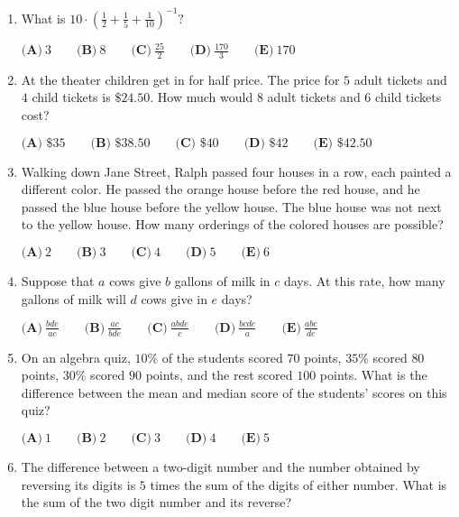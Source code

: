 \documentclass{article}
\begin{document}
\begin{enumerate}[label=\arabic*., itemsep=0.5em]
\item What is \(10 \cdot \left(\tfrac{1}{2} + \tfrac{1}{5} + \tfrac{1}{10}\right)^{-1}?\)

\( \textbf{(A)}\ 3\qquad\textbf{(B)}\ 8\qquad\textbf{(C)}\ \frac{25}{2}\qquad\textbf{(D)}\ \frac{170}{3}\qquad\textbf{(E)}\ 170\)\par \vspace{0.5em}\item At the theater children get in for half price.  The price for \(5\) adult tickets and \(4\) child tickets is \(\$24.50\).  How much would \(8\) adult tickets and \(6\) child tickets cost?

\(\textbf{(A) }\$35\qquad
\textbf{(B) }\$38.50\qquad
\textbf{(C) }\$40\qquad
\textbf{(D) }\$42\qquad
\textbf{(E) }\$42.50\)\par \vspace{0.5em}\item Walking down Jane Street, Ralph passed four houses in a row, each painted a different color. He passed the orange house before the red house, and he passed the blue house before the yellow house. The blue house was not next to the yellow house. How many orderings of the colored houses are possible?

\( \textbf{(A)}\ 2\qquad\textbf{(B)}\ 3\qquad\textbf{(C)}\ 4\qquad\textbf{(D)}\ 5\qquad\textbf{(E)}\ 6\)\par \vspace{0.5em}\item Suppose that \(a\) cows give \(b\) gallons of milk in \(c\) days. At this rate, how many gallons of milk will \(d\) cows give in \(e\) days?

\( \textbf{(A)}\ \frac{bde}{ac}\qquad\textbf{(B)}\ \frac{ac}{bde}\qquad\textbf{(C)}\ \frac{abde}{c}\qquad\textbf{(D)}\ \frac{bcde}{a}\qquad\textbf{(E)}\ \frac{abc}{de}\)\par \vspace{0.5em}\item On an algebra quiz, \(10\%\) of the students scored \(70\) points, \(35\%\) scored \(80\) points, \(30\%\) scored \(90\) points, and the rest scored \(100\) points. What is the difference between the mean and median score of the students' scores on this quiz?

\( \textbf{(A)}\ 1\qquad\textbf{(B)}\ 2\qquad\textbf{(C)}\ 3\qquad\textbf{(D)}\ 4\qquad\textbf{(E)}\ 5\)\par \vspace{0.5em}\item The difference between a two-digit number and the number obtained by reversing its digits is \(5\) times the sum of the digits of either number.  What is the sum of the two digit number and its reverse?


\end{enumerate}
\end{document}
